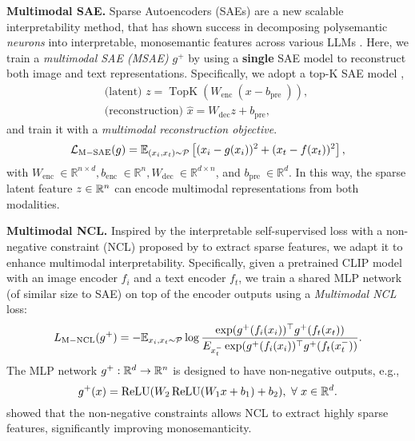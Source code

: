 \textbf{Multimodal SAE.} Sparse Autoencoders (SAEs) \citep{cunningham2023sparse} are a new scalable interpretability method,
that has shown success in decomposing polysemantic \emph{neurons} into interpretable, monosemantic {features} across various LLMs  \citep{templeton2024scaling,gao2024scaling,lieberum2024gemma}. Here, we train a \emph{multimodal SAE (MSAE)} $g^+$ by using a \textbf{single} SAE model to reconstruct both image and text representations. Specifically, we adopt a top-K SAE model \citep{makhzani2013k,gao2024scaling},
\begin{align}
&\text{(latent) }z=\operatorname{TopK}\left(W_{\text {enc }}\left(x-b_{\text {pre }}\right)\right),\quad \\
&\text{(reconstruction) }\hat{x}=W_{\mathrm{dec}} z+b_{\mathrm{pre}}, 
\end{align}
and train it with a \emph{multimodal reconstruction objective}.
\begin{equation}
\small
    {\mathcal{L}}_{\rm M-SAE}(g)=\mathbb{E}_{(x_i,x_t)\sim {\mathcal{P}}}\left[(x_i-g(x_i))^2+(x_t-f(x_t))^ 2\right],
    \nonumber
\end{equation}
with $W_{\text {enc }} \in \mathbb{R}^{n \times d}, b_{\text {enc }} \in \mathbb{R}^n, W_{\text {dec }} \in \mathbb{R}^{d \times n}$, and $b_{\text {pre }} \in \mathbb{R}^d$. 
In this way, the sparse latent feature $z\in{\mathbb{R}}^n$ can encode multimodal representations from both modalities.

\textbf{Multimodal NCL.} 
Inspired by the interpretable self-supervised loss with a non-negative constraint (NCL) proposed by \citep{wang2024ncl} to extract sparse features, we adapt it to enhance multimodal interpretability. 
Specifically, given a pretrained CLIP model with an image encoder $f_i$ and a text encoder $f_t$, 
we train a shared MLP network (of similar size to SAE) on top of the encoder outputs using a \emph{Multimodal NCL} loss:
\begin{equation}
\scriptsize
    L_{\rm M-NCL}(g^+)=-\mathbb{E}_{x_i,x_t\sim{\mathcal{P}}}\log\frac{\exp(g^+(f_i(x_i))^\top g^+(f_t(x_t))}{E_{x^-_t}\exp(g^+(f_i(x_i))^\top g^+(f_t(x^-_t))}.
\end{equation}
 The MLP network $g^+:{\mathbb{R}}^d\to{\mathbb{R}}^n$ is designed to have  non-negative outputs, e.g.,
\begin{equation}
\small
   g^+(x)=\operatorname{ReLU}(W_2\operatorname{ReLU}(W_1x+b_1)+b_2),\ \forall\ x\in\sR^d. 
\end{equation}
\citet{wang2024ncl} showed that the non-negative constraints allows NCL to extract highly sparse features, significantly improving monosemanticity.

